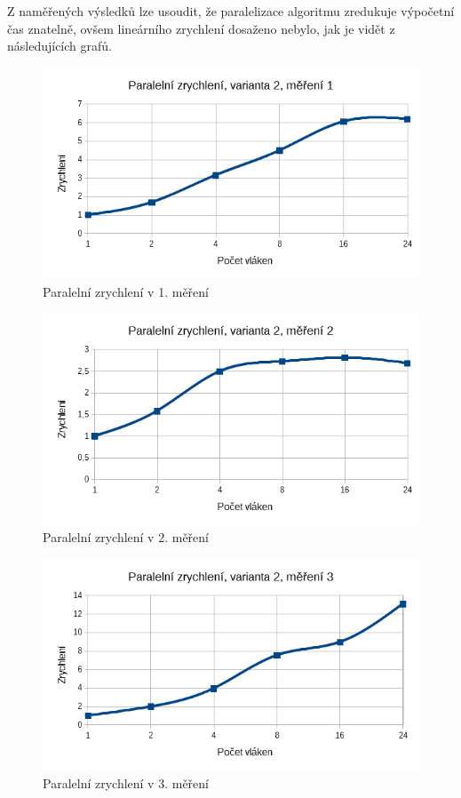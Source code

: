 \documentclass[12pt]{article}
\begin{document}
Z naměřených výsledků lze usoudit, že paralelizace algoritmu zredukuje výpočetní čas znatelně, ovšem lineárního zrychlení dosaženo nebylo, jak je vidět z následujících grafů.

\begin{figure}[H]
  \begin{center}
     \includegraphics[width=12cm]{images/sse1acc.png}
    \caption{Paralelní zrychlení v 1. měření} 
  \end{center}
\end{figure}

\begin{figure}
  \begin{center}
     \includegraphics[width=12cm]{images/sse2acc.png}
    \caption{Paralelní zrychlení v 2. měření} 
  \end{center}
\end{figure}

\begin{figure}
  \begin{center}
     \includegraphics[width=12cm]{images/sse3acc.png}
    \caption{Paralelní zrychlení v 3. měření} 
  \end{center}
\end{figure}
\end{document}
